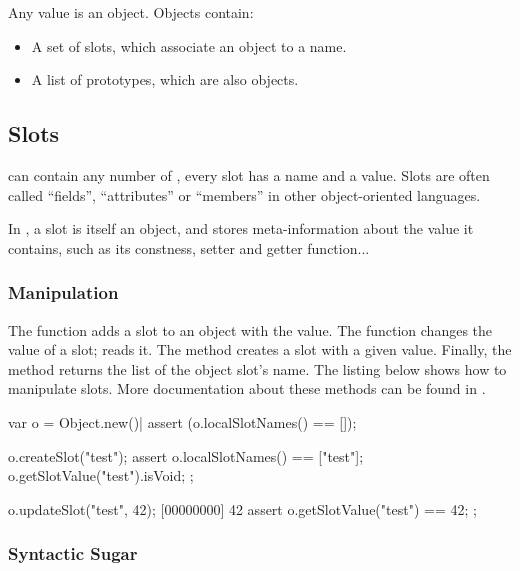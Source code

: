 Any \us value is an object. Objects contain:

\begin{itemize}
\item A set of slots, which associate an object to a name.
\item A list of prototypes, which are also objects.
\end{itemize}

\subsection{Slots}
\label{sec:lang:slots}

 can contain any number of , every slot has a name
and a value. Slots are often called ``fields'', ``attributes'' or
``members'' in other object-oriented languages.

In \us, a slot is itself an object, and stores meta-information about the value
it contains, such as its constness, setter and getter function...

\subsubsection{Manipulation}

The  function adds a slot to an object with the
 value. The  function changes
the value of a slot;  reads it. The
 method creates a slot with a given value. Finally,
the  method returns the list of the object
slot's name. The listing below shows how to manipulate slots. More
documentation about these methods can be found in .

\begin{urbiscript}
var o = Object.new()|
assert (o.localSlotNames() == []);

o.createSlot("test");
assert
{
  o.localSlotNames() == ["test"];
  o.getSlotValue("test").isVoid;
};

o.updateSlot("test", 42);
[00000000] 42
assert
{
  o.getSlotValue("test") == 42;
};
\end{urbiscript}

\subsubsection{Syntactic Sugar}


